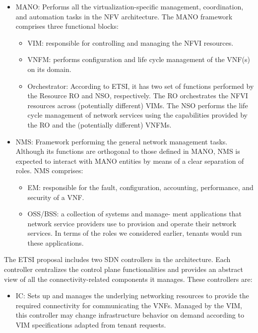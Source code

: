 \documentclass{report}
\begin{document}
\begin{itemize}
\item \gls{MANO}: Performs all the virtualization-specific management, coordination, and automation tasks in the NFV architecture. The MANO framework comprises three functional blocks:
\begin{itemize}
\item \gls{VIM}: responsible for controlling and managing the NFVI resources.
\end{itemize}
\begin{itemize}
\item \gls{VNFM}: performs configuration and life cycle management of the VNF(s) on its domain.
\end{itemize}
\begin{itemize}
\item Orchestrator: According to ETSI, it has two set of functions performed by the Resource \gls{RO} and \gls{NSO}, respectively. The RO orchestrates the NFVI resources across (potentially different) VIMs. The NSO performs the life cycle management of network
services using the capabilities provided by the
RO and the (potentially different) VNFMs.
\end{itemize}
\end{itemize}
\begin{itemize}
\item \gls{NMS}: Framework performing the general network management tasks. Although its functions are orthogonal to those defined in MANO, NMS is expected to interact with MANO entities by means of a clear separation of roles. NMS comprises:
\begin{itemize}
\item \gls{EM}: responsible for the fault, configuration,
accounting, performance, and security of a VNF.
\end{itemize}
\begin{itemize}
\item \gls{OSS/BSS}: a collection of systems and manage-
ment applications that network service providers use to provision and operate their network
services. In terms of the roles we considered
earlier, tenants would run these applications.
\end{itemize}
\end{itemize}
The ETSI proposal includes two SDN controllers
in the architecture. Each controller centralizes
the control plane functionalities and provides an
abstract view of all the connectivity-related components it manages. These controllers are:
\begin{itemize}
\item \gls{IC}: Sets up
and manages the underlying networking resources to provide the required connectivity for communicating the VNFs.
Managed by the VIM, this controller may change
infrastructure behavior on demand according to
VIM specifications adapted from tenant requests.
\end{itemize}
\end{document}

